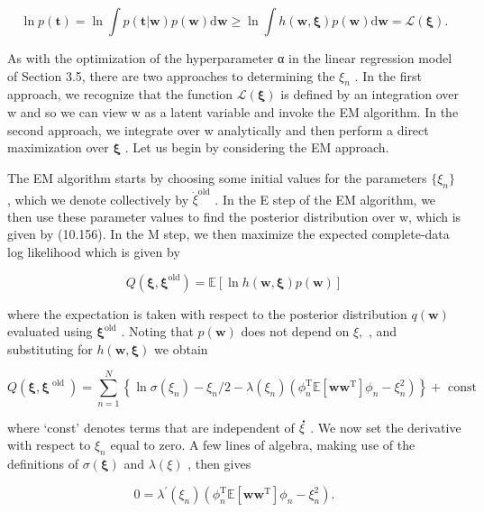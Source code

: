 \documentclass[
  10
]{article}
\begin{document}
\[
\ln p (\mathbf {t}) = \ln \int p (\mathbf {t} | \mathbf {w}) p (\mathbf {w}) \mathrm{d} \mathbf {w} \geqslant \ln \int h (\mathbf {w}, \boldsymbol {\xi}) p (\mathbf {w}) \mathrm{d} \mathbf {w} = \mathcal {L} (\boldsymbol {\xi}).\tag{10.159}
\]

As with the optimization of the hyperparameter α in the linear
regression model of Section 3.5, there are two approaches to determining
the \(\xi _ { n }\) . In the first approach, we recognize that the
function \(\mathcal { L } ( \pmb { \xi } )\) is defined by an
integration over w and so we can view w as a latent variable and invoke
the EM algorithm. In the second approach, we integrate over w
analytically and then perform a direct maximization over
\(\boldsymbol { \xi }\) . Let us begin by considering the EM approach.

The EM algorithm starts by choosing some initial values for the
parameters \(\{ \xi _ { n } \}\) , which we denote collectively by
\(\dot { \xi } ^ { \mathrm { { o l d } } }\) . In the E step of the EM
algorithm, we then use these parameter values to find the posterior
distribution over w, which is given by (10.156). In the M step, we then
maximize the expected complete-data log likelihood which is given by

\[
Q (\pmb {\xi}, \pmb {\xi} ^ {\mathrm{old}}) = \mathbb {E} \left[ \ln h (\mathbf {w}, \pmb {\xi}) p (\mathbf {w}) \right]\tag{10.160}
\]

where the expectation is taken with respect to the posterior
distribution \(q ( \mathbf { w } )\) evaluated using
\(\pmb { \xi } ^ { \mathrm { o l d } }\) . Noting that
\(p ( \mathbf { w } )\) does not depend on \(\xi ,\) , and substituting
for \(h ( \mathbf { w } , \pmb { \xi } )\) we obtain

\[
Q (\boldsymbol {\xi}, \boldsymbol {\xi} ^ {\text { old }}) = \sum_ {n = 1} ^ {N} \left\{\ln \sigma (\xi_ {n}) - \xi_ {n} / 2 - \lambda (\xi_ {n}) (\phi_ {n} ^ {\mathrm{T}} \mathbb {E} [ \mathbf {w w} ^ {\mathrm{T}} ] \phi_ {n} - \xi_ {n} ^ {2}) \right\} + \text { const }\tag{10.161}
\]

where `const' denotes terms that are independent of
\({ \bf \dot { \xi } }\) . We now set the derivative with respect to
\(\xi _ { n }\) equal to zero. A few lines of algebra, making use of the
definitions of \(\sigma ( \boldsymbol { \xi } )\) and
\(\lambda ( \xi )\) , then gives

\[
0 = \lambda^ {\prime} (\xi_ {n}) (\phi_ {n} ^ {\mathrm{T}} \mathbb {E} [ \mathbf {w w} ^ {\mathrm{T}} ] \phi_ {n} - \xi_ {n} ^ {2}).\tag{10.162}
\]
\end{document}
